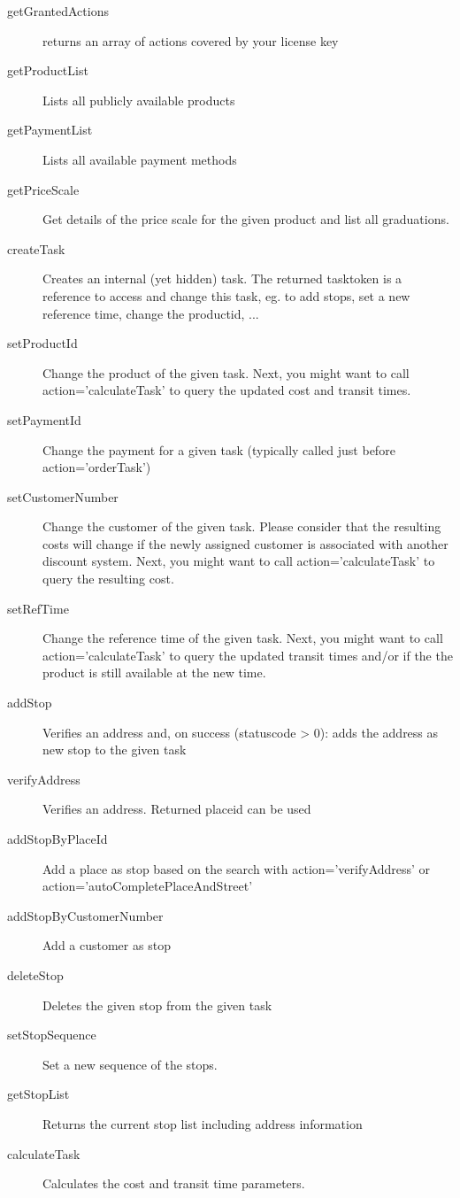 \begin{description}
  \item[getGrantedActions] returns an array of actions covered by your license key
  \item[getProductList] Lists all publicly available products
  \item[getPaymentList] Lists all available payment methods
  \item[getPriceScale] Get details of the price scale for the given product and list all graduations.
  \item[createTask] Creates an internal (yet hidden) task. The returned tasktoken is a reference to access and change this task, eg. to add stops, set a new reference time, change the productid, ...
  \item[setProductId] Change the product of the given task. Next, you might want to call action='calculateTask' to query the updated cost and transit times.
  \item[setPaymentId] Change the payment for a given task (typically called just before action='orderTask')
  \item[setCustomerNumber] Change the customer of the given task. Please consider that the resulting costs will change if the newly assigned customer is associated with another discount system. Next, you might want to call action='calculateTask' to query the resulting cost.
  \item[setRefTime] Change the reference time of the given task. Next, you might want to call action='calculateTask' to query the updated transit times and/or if the the product is still available at the new time.
  \item[addStop] Verifies an address and, on success (statuscode > 0): adds the address as new stop to the given task
  \item[verifyAddress] Verifies an address. Returned placeid can be used
  \item[addStopByPlaceId] Add a place as stop based on the search with action='verifyAddress' or action='autoCompletePlaceAndStreet'
  \item[addStopByCustomerNumber] Add a customer as stop
  \item[deleteStop] Deletes the given stop from the given task
  \item[setStopSequence] Set a new sequence of the stops.
  \item[getStopList] Returns the current stop list including address information
  \item[calculateTask] Calculates the cost and transit time parameters.

\end{description}
